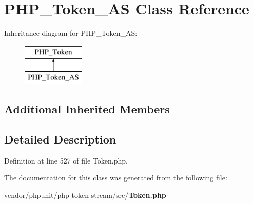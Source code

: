 \section{P\+H\+P\+\_\+\+Token\+\_\+\+A\+S Class Reference}
\label{class_p_h_p___token___a_s}
Inheritance diagram for P\+H\+P\+\_\+\+Token\+\_\+\+A\+S\+:\begin{figure}[H]
\begin{center}
\leavevmode
\includegraphics[height=2.000000cm]{class_p_h_p___token___a_s}
\end{center}
\end{figure}
\subsection*{Additional Inherited Members}


\subsection{Detailed Description}


Definition at line 527 of file Token.\+php.



The documentation for this class was generated from the following file\+:\begin{DoxyCompactItemize}
\item 
vendor/phpunit/php-\/token-\/stream/src/{\bf Token.\+php}\end{DoxyCompactItemize}
